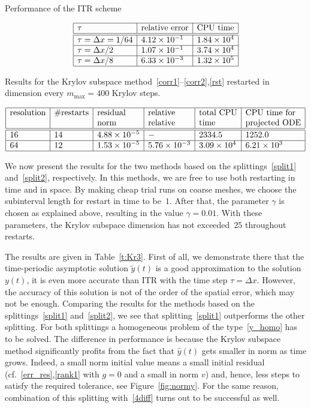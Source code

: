 \documentclass[11pt]{elsarticle}
\newcommand{\e}[1]{\times 10^{#1}}
\newcommand{\yh}{\widehat{y}}
\newcommand{\yt}{\widetilde{y}}
\begin{document}
\begin{table}
\caption{Performance of the ITR scheme}
\label{t:ITR}
\centering
\[ \begin{array}{|l|l|l|} \hline
\tau & \text{relative error} & \text{CPU time} \\ \hline\hline
\tau=\Delta x = 1/64 & 4.12 \e{-1} & 1.84 \e{4} \\ \hline
\tau=\Delta x/2      & 1.07 \e{-1} & 3.74 \e{4} \\ \hline
\tau=\Delta x/8      & 6.33 \e{-3} & 1.32 \e{5} \\ \hline
\end{array} \]
\end{table}

\begin{table}
\caption{Results for 
the Krylov subspace method~\eqref{corr1}--\eqref{corr2},\eqref{rst}
restarted in dimension every $m_{\max}=400$ Krylov steps.}
\label{t:Kr2}
\centering
\[
\begin{array}{|l|l|l|l|l|l|} \hline
\text{resolution} &  \# \text{restarts} & \text{residual} & \text{relative} & 
\text{total CPU} & \text{CPU time for}  \\
 &  & \text{norm} & \text{relative} & \text{time} & \text{projected ODE}  \\ 
\hline\hline
16 & 14 & 4.88 \e{-5} & - & 2334.5 & 1252.0 \\ \hline
64 & 12 & 1.53 \e{-5} & 5.76 \e{-3} & 3.09 \e{4} & 6.21 \e{3} \\ \hline
\end{array}
\]
\end{table}

We now present the results for the two methods based on the 
splittings~\eqref{split1} and~\eqref{split2}, respectively.
In this methods, we are free to use both restarting in time
and in space.  By making cheap trial runs on coarse meshes,
we choose the subinterval length for restart in time to be~$1$.
After that, the parameter $\gamma$ is chosen as explained
above, resulting in the value $\gamma=0.01$.  With these 
parameters, the Krylov subspace dimension has not 
exceeded~$25$ throughout restarts.

The results are given in Table~\ref{t:Kr3}.
First of all, we demonstrate there that the time-periodic asymptotic solution 
$\yt(t)$ is a good approximation to the solution $y(t)$,
it is even more accurate than ITR with the time step $\tau=\Delta x$.
However, the accuracy of this solution is not of the order
of the spatial error, which may not be enough.
Comparing the results for the methods based on the 
splittings~\eqref{split1} and~\eqref{split2}, we see
that splitting~\eqref{split1} outperforms the other splitting.
For both splittings a homogeneous problem of the type~\eqref{y_homo}
has to be solved.  The difference in performance is because
the Krylov subspace method significantly profits from the fact that
$\yh(t)$ gets smaller in norm as time grows.
Indeed, a small  norm initial value means a small initial
residual (cf.~\eqref{err_res},\eqref{rank1} with $g=0$ and a small
in norm $v$) and, hence, less steps to satisfy the required
tolerance, see Figure~\ref{fig:normy}.
For the same reason, combination of this splitting
with~\eqref{4diff} turns out to be successful as well.
\end{document}
